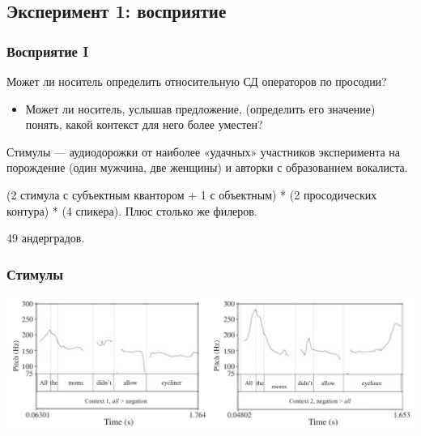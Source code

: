 \documentclass{beamer}
\begin{document}
\subsection{Эксперимент 1: восприятие}
\begin{frame}
    \frametitle{Восприятие I}

    Может ли носитель определить относительную СД операторов по просодии?

    \begin{itemize}
        \item Может ли носитель, услышав предложение, (определить его значение) понять, какой контекст для него более уместен?
    \end{itemize}

    \pause

    Стимулы — аудиодорожки от наиболее «удачных» участников эксперимента на порождение (один мужчина, две женщины) и авторки с образованием вокалиста.

    (2 стимула с субъектным квантором + 1 с объектным) * (2 просодических контура) * (4 спикера). Плюс столько же филеров.

    \pause

    49 андерградов.

\end{frame}

\begin{frame}
    \frametitle{Стимулы}

    \includegraphics[width=\textwidth]{images/pitch 1.png}

\end{frame}
\end{document}

